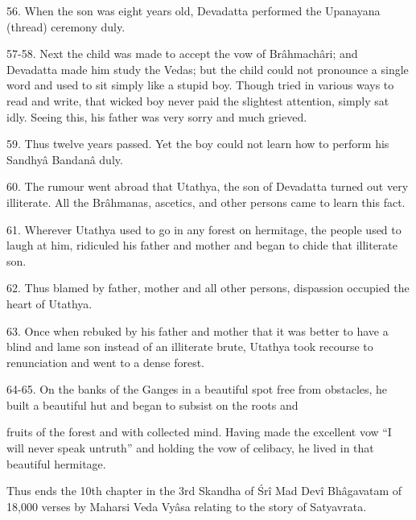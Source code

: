 56. When the son was eight years old, Devadatta performed the Upanayana (thread) ceremony duly.

57-58. Next the child was made to accept the vow of Br\^ahmach\^ari; and Devadatta made him study the Vedas; but the child could not pronounce a single word and used to sit simply like a stupid boy. Though tried in various ways to read and write, that wicked boy never paid the slightest attention, simply sat idly. Seeing this, his father was very sorry and much grieved.

59. Thus twelve years passed. Yet the boy could not learn how to perform his Sandhy\^a Bandan\^a duly.

60. The rumour went abroad that Utathya, the son of Devadatta turned out very illiterate. All the Br\^ahmanas, ascetics, and other persons came to learn this fact.

61. Wherever Utathya used to go in any forest on hermitage, the people used to laugh at him, ridiculed his father and mother and began to chide that illiterate son.

62. Thus blamed by father, mother and all other persons, dispassion occupied the heart of Utathya.

63. Once when rebuked by his father and mother that it was better to have a blind and lame son instead of an illiterate brute, Utathya took recourse to renunciation and went to a dense forest.

64-65. On the banks of the Ganges in a beautiful spot free from obstacles, he built a beautiful hut and began to subsist on the roots and

fruits of the forest and with collected mind. Having made the excellent vow ``I will never speak untruth'' and holding the vow of celibacy, he lived in that beautiful hermitage.

Thus ends the 10th chapter in the 3rd Skandha of \'Sr\^i Mad Dev\^i Bh\^agavatam of 18,000 verses by Maharsi Veda Vy\^asa relating to the story of Satyavrata.